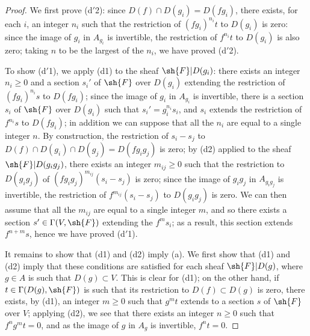 \begin{proof}
We first prove (d$'$2): since $D(f)\cap D(g_i)=D(fg_i)$, there exists, for each $i$, an integer $n_i$ such that the restriction of $(fg_i)^{n_i}t$ to $D(g_i)$ is zero:
since the image of $g_i$ in $A_{g_i}$ is invertible, the restriction of $f^{n_i}t$ to $D(g_i)$ is also zero;
taking $n$ to be the largest of the $n_i$, we have proved (d$'$2).

To show (d$'$1), we apply (d1) to the sheaf $\sh{F}|D(g_i)$: there exists an integer $n_i\geq 0$ and a section $s_i'$ of $\sh{F}$ over $D(g_i)$ extending the restriction of $(fg_i)^{n_i}s$ to $D(fg_i)$;
since the image of $g_i$ in $A_{g_i}$ is invertible, there is a section $s_i$ of $\sh{F}$ over $D(g_i)$ such that $s_i'=g_i^{n_i}s_i$, and $s_i$ extends the
restriction of $f^{n_i}s$ to $D(fg_i)$;
in addition we can suppose that all the $n_i$ are equal to a single integer $n$.
By construction, the restriction of $s_i-s_j$ to $D(f)\cap D(g_i)\cap D(g_j)=D(fg_i g_j)$ is zero;
by (d2) applied to the sheaf $\sh{F}|D(g_i g_j)$, there exists an integer $m_{ij}\geq 0$ such that the restriction to $D(g_i g_j)$ of $(fg_i g_j)^{m_{ij}}(s_i-s_j)$ is zero;
since the image of $g_i g_j$ in $A_{g_i g_j}$ is invertible, the restriction of $f^{m_{ij}}(s_i-s_j)$ to $D(g_i g_j)$ is zero.
We can then assume that all the $m_{ij}$ are equal to a single integer $m$, and so there exists a section $s'\in\Gamma(V,\sh{F})$ extending the $f^m s_i$;
as a result, this section extends $f^{n+m}s$, hence we have proved (d$'$1).

It remains to show that (d1) and (d2) imply (a).
We first show that (d1) and (d2) imply that these conditions are satisfied for each sheaf $\sh{F}|D(g)$, where $g\in A$ is such that $D(g)\subset V$.
This is clear for (d1);
on the other hand, if $t\in\Gamma(D(g),\sh{F})$ is such that its restriction to $D(f)\subset D(g)$ is zero, there exists, by (d1), an integer $m\geq 0$ such that $g^m t$
extends to a section $s$ of $\sh{F}$ over $V$;
applying (d2), we see that there exists an integer $n\geq 0$ such that $f^n g^m t=0$, and as the image of $g$ in $A_g$ is invertible, $f^n t=0$.


\end{proof}

